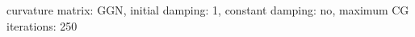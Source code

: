 curvature matrix: $\text{GGN}$, initial damping: 1, constant damping: $\text{no}$, maximum CG iterations: 250